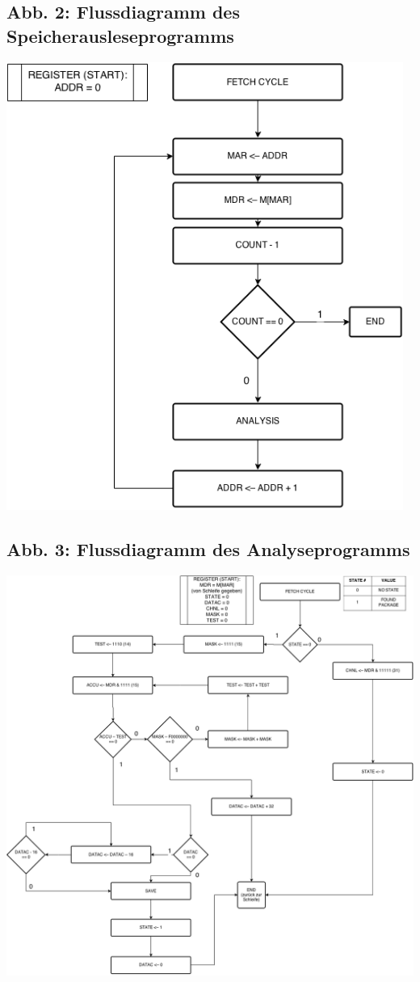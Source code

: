\documentclass[12pt,titlepage]{article}
\begin{document}
\subsection{Abb. 2: Flussdiagramm des Speicherausleseprogramms}
\includegraphics[width=13cm]{readFromMemory.png}

\subsection{Abb. 3: Flussdiagramm des Analyseprogramms}
\includegraphics[width=18cm]{analyseData.png}
\end{document}
